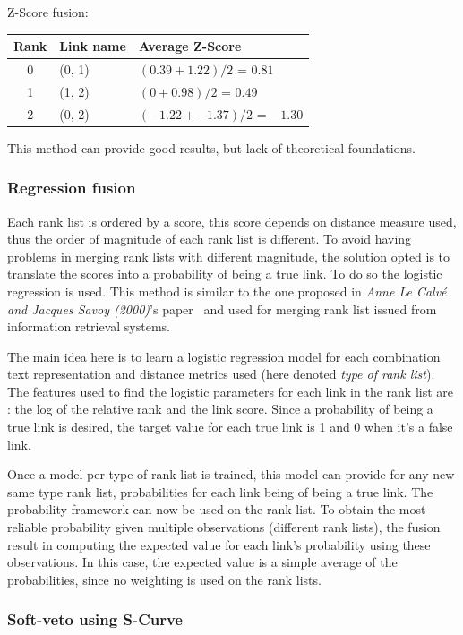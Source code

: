 Z-Score fusion:

\begin{tabular}{c l l}
  \toprule
  Rank & Link name & Average Z-Score \\
  \midrule
  0 & (0, 1) & $(0.39 + 1.22) / 2$ = $0.81$ \\
  1 & (1, 2) & $(0 + 0.98) / 2$ = $0.49$ \\
  2 & (0, 2) & $(-1.22 + -1.37) / 2$ = $-1.30$ \\
  \bottomrule
\end{tabular}

This method can provide good results, but lack of theoretical foundations.

\subsubsection{Regression fusion}

Each rank list is ordered by a score, this score depends on distance measure used, thus the order of magnitude of each rank list is different.
To avoid having problems in merging rank lists with different magnitude, the solution opted is to translate the scores into a probability of being a true link.
To do so the logistic regression is used.
This method is similar to the one proposed in \textit{Anne Le Calvé and Jacques Savoy (2000)}'s paper~\cite{le_calve_database_merging} and used for merging rank list issued from information retrieval systems.

The main idea here is to learn a logistic regression model for each combination text representation and distance metrics used (here denoted \textit{type of rank list}).
The features used to find the logistic parameters for each link in the rank list are : the log of the relative rank and the link score.
Since a probability of being a true link is desired, the target value for each true link is 1 and 0 when it's a false link.

Once a model per type of rank list is trained, this model can provide for any new same type rank list, probabilities for each link being of being a true link.
The probability framework can now be used on the rank list.
To obtain the most reliable probability given multiple observations (different rank lists), the fusion result in computing the expected value for each link's probability using these observations.
In this case, the expected value is a simple average of the probabilities, since no weighting is used on the rank lists.

\subsubsection{Soft-veto using S-Curve}

